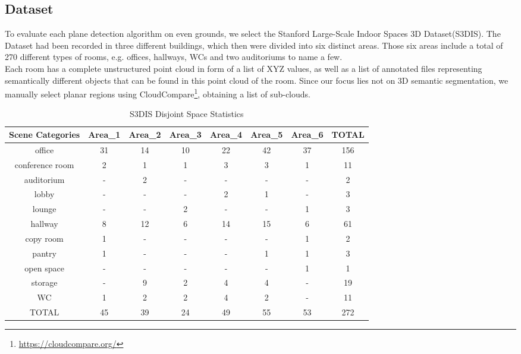 \documentclass[main.tex]{subfiles}
\begin{document}
\subsection{Dataset}
To evaluate each plane detection algorithm on even grounds, we select the Stanford Large-Scale Indoor Spaces 3D Dataset(S3DIS)\cite{2017arXiv170201105A}. The Dataset had been recorded in three different buildings,
which then were divided into six distinct areas. Those six areas include a total of 270 different types of rooms, e.g. offices, hallways, WCs and two auditoriums to name a few.\\
Each room has a complete unstructured point cloud in form of a list of XYZ values, as well as a list of annotated files representing semantically different objects that can be found in this point cloud
of the room.
Since our focus lies not on 3D semantic segmentation, we manually select planar regions using CloudCompare\footnote{\href{https://cloudcompare.org/}{https://cloudcompare.org/}}, obtaining a list of sub-clouds.

\begin{table}[]
    \centering
    \begin{tabular}{c|c|c|c|c|c|c|c}
        \hline
        Scene Categories & Area\_1 & Area\_2 & Area\_3 & Area\_4 & Area\_5 & Area\_6 & TOTAL \\ \hline
        office           & 31      & 14      & 10      & 22      & 42      & 37      & 156   \\ \hline
        conference room  & 2       & 1       & 1       & 3       & 3       & 1       & 11    \\ \hline
        auditorium       & -       & 2       & -       & -       & -       & -       & 2     \\ \hline
        lobby            & -       & -       & -       & 2       & 1       & -       & 3     \\ \hline
        lounge           & -       & -       & 2       & -       & -       & 1       & 3     \\ \hline
        hallway          & 8       & 12      & 6       & 14      & 15      & 6       & 61    \\ \hline
        copy room        & 1       & -       & -       & -       & -       & 1       & 2     \\ \hline
        pantry           & 1       & -       & -       & -       & 1       & 1       & 3     \\ \hline
        open space       & -       & -       & -       & -       & -       & 1       & 1     \\ \hline
        storage          & -       & 9       & 2       & 4       & 4       & -       & 19    \\ \hline
        WC               & 1       & 2       & 2       & 4       & 2       & -       & 11    \\ \hline
        TOTAL            & 45      & 39      & 24      & 49      & 55      & 53      & 272   \\
    \end{tabular}
    \caption{S3DIS Disjoint Space Statistics}
    \label{tab:stanfordStats}
\end{table}
\end{document}
